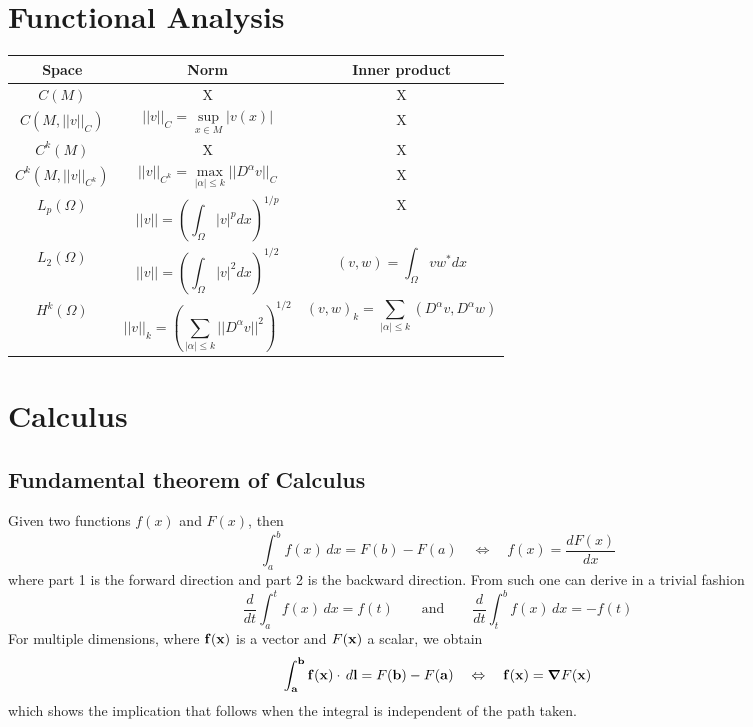\documentclass[oneside,a4paper,11pt]{report}
\begin{document}
\section{Functional Analysis}
\begin{center}
\begin{tabular}{|c|c|c|}
\hline
Space  &Norm & Inner product\\
\hline
$C(M)$ & X & X\\
\hline
$C(M,||v||_C)$ & \parbox{4cm}{\[||v||_C = \sup_{x \in M} |v(x)|\]} & X\\
\hline
$C^k(M)$ & X & X\\
\hline
$C^k(M,||v||_{C^k})$ & \parbox{5cm}{\[||v||_{C^k} = \max_{|\alpha| \le k} ||D^\alpha v||_C\]} & X\\
\hline
$L_p(\Omega)$ & \parbox{5cm}{\[||v|| = \left ( \int_\Omega |v|^p dx\right)^{1/p}\]} & X\\
\hline
$L_2(\Omega)$ & \parbox{5cm}{\[||v|| = \left ( \int_\Omega |v|^2 dx\right)^{1/2}\]} & \parbox{5cm}{\[(v,w) = \int_\Omega vw^* dx\]}\\
\hline
$H^k(\Omega)$ & \parbox{5cm}{\[||v||_k = \left(\sum_{|\alpha| \le k} ||D^\alpha v||^2 \right )^{1/2}\]} & \parbox{5cm}{\[(v,w)_k = \sum_{|\alpha | \le k} (D^\alpha v, D^\alpha w)\]}\\
\hline
\end{tabular}	
\end{center}

\section{Calculus}
\subsection{Fundamental theorem of Calculus}
Given two functions $f(x)$ and $F(x)$, then
\[ \int_a^b f(x) \,dx = F(b) - F(a) \quad \Leftrightarrow \quad f(x) = \frac{dF(x)}{dx} \]
where part 1 is the forward direction and part 2 is the backward direction. From such one can derive in a trivial fashion 
\[ \frac{d}{dt} \int_a^t f(x) \,dx = f(t) \qquad \text{and} \qquad \frac{d}{dt}\int_t^b f(x) \,dx = - f(t) \]
For multiple dimensions, where $\mathbf{f}(\mathbf{x})$ is a vector and $F(\mathbf{x})$ a scalar, we obtain
\[ \int_{\mathbf{a}}^{\mathbf{b}} \mathbf{f}(\mathbf{x}) \cdot \, d\mathbf{l} = F(\mathbf{b}) - F(\mathbf{a}) \quad \Leftrightarrow \quad \mathbf{f}(\mathbf{x}) = \boldsymbol \nabla F(\mathbf{x}) \]
which shows the implication that follows when the integral is independent of the path taken.
\end{document}
